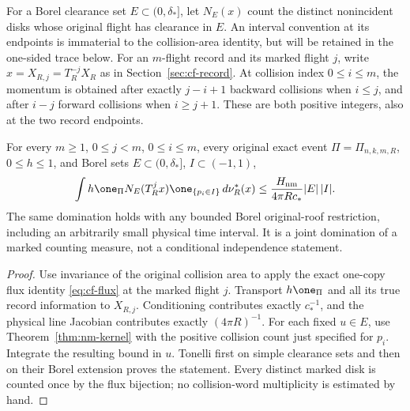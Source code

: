 For a Borel clearance set $E\subset(0,\delta_*]$, let $N_E(x)$
count the distinct nonincident disks whose original flight has
clearance in $E$.  An interval convention at its endpoints is
immaterial to the collision-area identity, but will be retained in
the one-sided trace below.  For an $m$-flight record and its marked
flight $j$, write $x=X_{R,j}=T_R^{-j}X_R$ as in
Section~\ref{sec:cf-record}.  At collision index $0\le i\le m$,
the momentum is obtained after exactly $j-i+1$ backward collisions
when $i\le j$, and after $i-j$ forward collisions when $i\ge j+1$.
These are both positive integers, also at the two record endpoints.

\begin{corollary}
\label{cor:nm-joint}
For every $m\ge1$, $0\le j<m$, $0\le i\le m$, every original
exact event $\Pi=\Pi_{n,k,m,R}$, $0\le h\le1$, and Borel sets
$E\subset(0,\delta_*]$, $I\subset(-1,1)$,
\begin{equation}\label{eq:nm-joint}
 \int h\one_\Pi N_E(T_R^jx)\one_{\{p_i\in I\}}\,d\nu_R^*(x)
             \le\frac{H_{\rm nm}}{4\pi R c_*}|E|\,|I|.
\end{equation}
The same domination holds with any bounded Borel original-roof
restriction, including an arbitrarily small physical time interval.
It is a joint domination of a marked counting measure, not a
conditional independence statement.
\end{corollary}
\begin{proof}
Use invariance of the original collision area to apply the exact
one-copy flux identity \eqref{eq:cf-flux} at the marked flight
$j$.  Transport $h\one_\Pi$ and all its true record information
to $X_{R,j}$.  Conditioning contributes exactly $c_*^{-1}$, and
the physical line Jacobian contributes exactly $(4\pi R)^{-1}$.
For each fixed $u\in E$, use Theorem~\ref{thm:nm-kernel} with
the positive collision count just specified for $p_i$.  Integrate
the resulting bound in $u$.  Tonelli first on simple clearance
sets and then on their Borel extension proves the statement.
Every distinct marked disk is counted once by the flux bijection;
no collision-word multiplicity is estimated by hand.
\end{proof}

